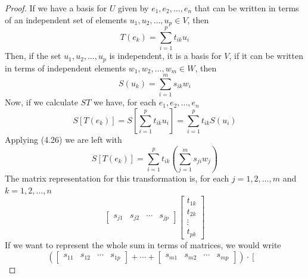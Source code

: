 \documentclass{book}
\begin{document}
\begin{proof}
    If we have a basis for $U$ given by $e_1,e_2,\dots,e_n$ that can be written in terms
    of an independent set of elements $u_1,u_2,\dots,u_p\in V$, then
    \begin{equation}
        T(e_k) = \sum_{i=1}^{p}{t_{ik} u_i}
    \end{equation}
    Then, if the set $u_1,u_2,\dots,u_p$ is independent, it is a basis for $V$, if it can be written in terms of
    independent elements $w_1,w_2,\dots,w_m\in W$, then
    \begin{equation}
        S(u_k) = \sum_{i=1}^{m}{s_{ik} w_i}
    \end{equation}
    Now, if we calculate $ST$ we have, for each $e_1,e_2,\dots,e_n$
    \begin{equation}
        S\left[T\left(e_k\right)\right] = S\left[\sum_{i=1}^{p}{t_{ik} u_i}\right] = \sum_{i=1}^{p}{t_{ik} S(u_i)}
    \end{equation}
    Applying (4.26) we are left with
    \begin{equation}
        S\left[T\left(e_k\right)\right]=\sum_{i=1}^{p}{t_{ik} \left(\sum_{j=1}^{m}{s_{ji}w_j}\right)}
    \end{equation}
    The matrix representation for this transformation is, for each $j=1,2,\dots,m$ and $k=1,2,\dots,n$
    \begin{equation*}
        \left[\begin{matrix}
                s_{j1} & s_{j2} & \cdots & s_{jp}
            \end{matrix}\right]
        \left[\begin{matrix}
                t_{1k} \\t_{2k}\\\vdots\\t_{pk}
            \end{matrix}\right]
    \end{equation*}
    If we want to represent the whole sum in terms of matrices, we would write
    \begin{equation}
        \left(
        \left[\begin{matrix}
                s_{11} & s_{12} & \cdots & s_{1p}
            \end{matrix}\right]
        + \cdots +
        \left[\begin{matrix}
                s_{m1} & s_{m2} & \cdots & s_{mp}
            \end{matrix}\right]
        \right)\cdot  \left[\begin{matrix}

\end{matrix}
\end{equation}
\end{proof}
\end{document}
